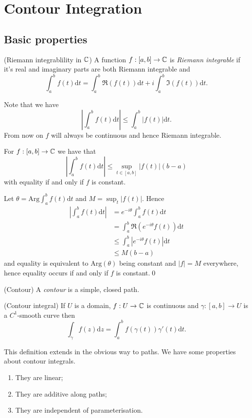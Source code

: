 \documentclass{article}
\newcommand{\Arg}{\mathrm{Arg}}
\begin{document}
\section{Contour Integration}
\subsection{Basic properties}
\begin{definition}
	(Riemann integrablility in $ \mathbb{C} $) A function $ f:[a,b]\to\mathbb{C} $ is \textit{Riemann integrable} if it's real and imaginary parts are both Riemann integrable and
	\[
		\int_a^b f(t)\mathrm dt = \int_a^b \Re(f(t)) \mathrm dt + i\int_a^b \Im(f(t)) \mathrm dt.
	\]
\end{definition}
Note that we have
\[
	\left|\int_a^b f(t)\mathrm dt\right| \le \int_a^b |f(t)|\mathrm dt.
\]
From now on $ f $ will always be continuous and hence Riemann integrable.
\begin{proposition}
	For $ f:[a,b]\to \mathbb{C} $ we have that
	\[
		\left|\int_a^b f(t)\mathrm dt\right| \le \sup_{t\in[a,b]}|f(t)|(b-a)
	\]
	with equality if and only if $ f $ is constant.
\end{proposition}
\pf Let $ \theta = \Arg\int_a^b f(t)\mathrm dt $ and $ M =\sup_t |f(t)| $. Hence
\begin{align*}
	\left|\int_a^b f(t)\mathrm dt\right| &= e^{-i\theta} \int_a^b f(t)\mathrm dt\\
					     &= \int_a^b \Re(e^{-i\theta} f(t))\mathrm dt\\
					     &\le \int_a^b |e^{-i\theta} f(t)|\mathrm dt \\
					     &\le M(b-a)
\end{align*}
and equality is equivalent to $ \Arg(\theta) $ being constant and $ |f| = M $ everywhere, hence equality occurs if and only if $ f $ is constant.\qed
\par
\begin{definition}
	(Contour) A \textit{contour} is a simple, closed path.
\end{definition}
\begin{definition}
	(Contour integral) If $ U $ is a domain, $ f:U\to \mathbb{C} $ is continuous and $ \gamma:[a,b]\to U $ is a $ C^1 $-smooth curve then
	\[
		\int_\gamma f(z) \mathrm dz = \int_a^b f(\gamma(t))\gamma'(t)\mathrm dt.
	\]
\end{definition}
This definition extends in the obvious way to paths. We have some properties about contour integrals.
\begin{enumerate}
	\item They are linear;
	\item They are additive along paths;
	\item They are independent of parameterisation.
\end{enumerate}
\end{document}
